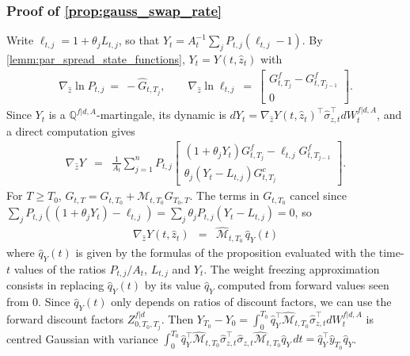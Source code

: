 \documentclass[11pt,english]{amsart}
\newcommand{\QQ}{\mathbb{Q}}
\theoremstyle{definition}
\begin{document}
\subsubsection{Proof of \autoref{prop:gauss_swap_rate}}
Write $\ell_{t,j} = 1+\theta_jL_{t,j}$, so that $Y_t = A_t^{-1}\sum_j P_{t,j}(\ell_{t,j}-1)$. By \autoref{lemm:par_spread_state_functions}, $Y_t = Y(t,\hat{z}_t)$ with
\begin{eqnarray*}
  \nabla_{\hat{z}} \ln P_{t,j} ~=~ -\hat{G}_{t,T_j} , \qquad
  \nabla_{\hat{z}} \ln \ell_{t,j} ~=~ \begin{bmatrix} G^f_{t,T_j} - G^f_{t,T_{j-1}} \\ 0 \end{bmatrix} .
\end{eqnarray*}
Since $Y_t$ is a $\QQ^{f|d,A}$-martingale, its dynamic is $dY_t = \nabla_{\hat{z}}Y(t,\hat{z}_t)^\top\hat{\sigma}^\top_{z,t}dW^{f|d,A}_t$, and a direct computation gives
\begin{eqnarray*}
  \nabla_{\hat{z}} Y &=& \frac{1}{A_t} \sum_{j=1}^n P_{t,j} \begin{bmatrix} (1+\theta_jY_t)G^f_{t,T_j} - \ell_{t,j}G^f_{t,T_{j-1}} \\ \theta_j(Y_t - L_{t,j})G^c_{t,T_j} \end{bmatrix} .
\end{eqnarray*}
For $T\ge T_0$, $G_{t,T} = G_{t,T_0} + \mathcal{M}_{t,T_0}G_{T_0,T}$. The terms in $G_{t,T_0}$ cancel since $\sum_j P_{t,j}\left((1+\theta_jY_t) - \ell_{t,j}\right) = \sum_j\theta_jP_{t,j}(Y_t - L_{t,j}) = 0$, so
\begin{eqnarray*}
  \nabla_{\hat{z}} Y(t,\hat{z}_t) &=& \hat{\mathcal{M}}_{t,T_0}\, \hat{q}_Y(t)
\end{eqnarray*}
where $\hat{q}_Y(t)$ is given by the formulas of the proposition evaluated with the time-$t$ values of the ratios $P_{t,j}/A_t$, $L_{t,j}$ and $Y_t$. The weight freezing approximation consists in replacing $\hat{q}_Y(t)$ by its value $\hat{q}_Y$ computed from forward values seen from $0$. Since $\hat{q}_Y(t)$ only depends on ratios of discount factors, we can use the forward discount factors $Z^{f|d}_{0,T_0,T_j}$. Then $Y_{T_0} - Y_0 = \int_0^{T_0} \hat{q}_Y^\top \hat{\mathcal{M}}_{t,T_0}\hat{\sigma}^\top_{z,t} dW^{f|d,A}_t$ is centred Gaussian with variance $\int_0^{T_0}\hat{q}_Y^\top \hat{\mathcal{M}}_{t,T_0}\hat{\sigma}^\top_{z,t}\hat{\sigma}_{z,t}\hat{\mathcal{M}}_{t,T_0}\hat{q}_Y\,dt = \hat{q}_Y^\top\hat{y}_{T_0}\hat{q}_Y$.
\end{document}
